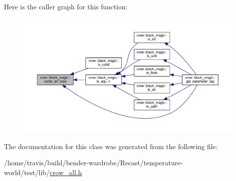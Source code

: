 Here is the caller graph for this function\-:
\nopagebreak
\begin{figure}[H]
\begin{center}
\leavevmode
\includegraphics[width=350pt]{classcrow_1_1black__magic_1_1const__str_add61cd419d28fde6d09d78fab4248063_icgraph}
\end{center}
\end{figure}




The documentation for this class was generated from the following file\-:\begin{DoxyCompactItemize}
\item 
/home/travis/build/bender-\/wardrobe/\-Recast/temperature-\/world/test/lib/\hyperlink{crow__all_8h}{crow\-\_\-all.\-h}\end{DoxyCompactItemize}
